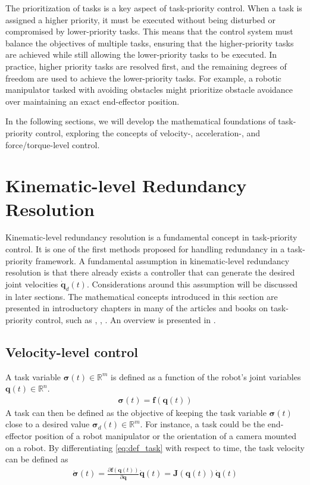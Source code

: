 The prioritization of tasks is a key aspect of task-priority control. When a task is assigned a higher priority, it must be executed without being disturbed or compromised by lower-priority tasks. This means that the control system must balance the objectives of multiple tasks, ensuring that the higher-priority tasks are achieved while still allowing the lower-priority tasks to be executed. In practice, higher priority tasks are resolved first, and the remaining degrees of freedom are used to achieve the lower-priority tasks. For example, a robotic manipulator tasked with avoiding obstacles might prioritize obstacle avoidance over maintaining an exact end-effector position.

In the following sections, we will develop the mathematical foundations of task-priority control, exploring the concepts of velocity-, acceleration-, and force/torque-level control.

\section{Kinematic-level Redundancy Resolution}

Kinematic-level redundancy resolution is a fundamental concept in task-priority control.
It is one of the first methods proposed for handling redundancy in a task-priority framework.
A fundamental assumption in kinematic-level redundancy resolution is that there
already exists a controller that can generate the desired joint velocities $\dot{\bm{q}}_d(t)$.
Considerations around this assumption will be discussed in later sections.
The mathematical concepts introduced in this section are presented in introductory
chapters in many of the articles and books on task-priority control, such as
\cite{hanafusa1981}, \cite{nakamura1987}, \cite{khatib1987}. An overview is
presented in \cite{chiaverini1997}.

\subsection{Velocity-level control}
\label{sec:velocity_level_control}

A task variable $\bm{\sigma}(t) \in \mathbb{R}^m$ is defined as a function of the robot's
joint variables $\bm{q}(t) \in \mathbb{R}^n$.
\begin{align}
    \bm{\sigma}(t) = \bm{f}(\bm{q}(t)) \label{eq:def_task}
\end{align}
A task can then be defined as the objective of keeping the task variable $\bm{\sigma}(t)$
close to a desired value $\bm{\sigma}_d(t) \in \mathbb{R}^m$. For instance, a task could
be the end-effector position of a robot manipulator or the orientation of a camera mounted
on a robot. By differentiating \autoref{eq:def_task} with respect to time, the task velocity
can be defined as
\begin{align}
    \dot{\bm{\sigma}}(t) = \frac{\partial \bm{f}(\bm{q}(t))}{\partial \bm{q}} \dot{\bm{q}}(t)= \bm{J}(\bm{q}(t)) \dot{\bm{q}}(t) \label{eq:def_task_jacobian}
\end{align}

